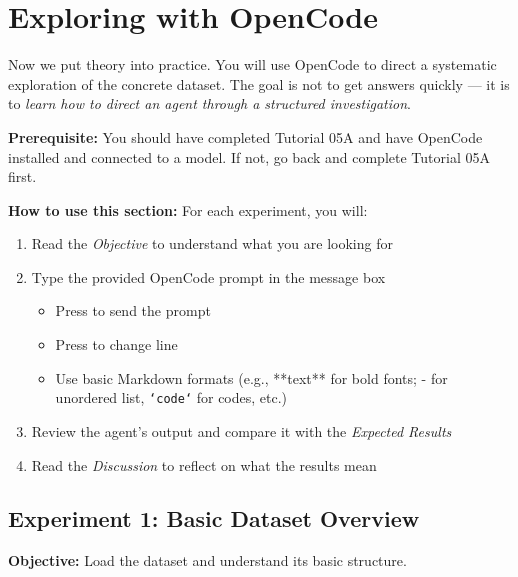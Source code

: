 \documentclass[11pt]{article}
\newcommand{\key}[1]{\keystroke{#1}}
\newcommand{\keystroke}[1]{%
  \tikz[baseline=(key.base)]{%
    \node[draw, rounded corners=2pt, inner sep=2pt, fill=gray!10,
          font=\ttfamily\small] (key) {#1};%
  }%
}
\begin{document}
\section{Exploring with OpenCode}
\label{sec:experiments}

Now we put theory into practice.  You will use OpenCode to direct a systematic exploration of the concrete dataset.  The goal is not to get answers quickly --- it is to \emph{learn how to direct an agent through a structured investigation}.

\begin{alert-box}
\textbf{Prerequisite:} You should have completed Tutorial 05A and have OpenCode installed and connected to a model.  If not, go back and complete Tutorial 05A first.
\end{alert-box}

\begin{ex-box}
\textbf{How to use this section:}  For each experiment, you will:
\begin{enumerate}[nosep]
  \item Read the \emph{Objective} to understand what you are looking for
  \item Type the provided OpenCode prompt in the message box 
  \begin{itemize}
        \item Press \key{Enter} to send the prompt
        \item Press \key{Shift+Enter} to change line
        \item Use basic Markdown formats (e.g., **text** for bold fonts; - for unordered list, \texttt{`code`} for codes, etc.)
  \end{itemize}



  
  \item Review the agent's output and compare it with the \emph{Expected Results}
  \item Read the \emph{Discussion} to reflect on what the results mean
\end{enumerate}
\end{ex-box}

\subsection{Experiment 1: Basic Dataset Overview}
\label{sec:experiment-1}

\textbf{Objective:} Load the dataset and understand its basic structure.
\end{document}

